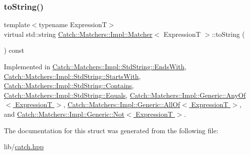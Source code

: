 \subsubsection{\texorpdfstring{to\+String()}{toString()}}
{\footnotesize\ttfamily template$<$typename ExpressionT$>$ \\
virtual std\+::string \hyperlink{struct_catch_1_1_matchers_1_1_impl_1_1_matcher}{Catch\+::\+Matchers\+::\+Impl\+::\+Matcher}$<$ ExpressionT $>$\+::to\+String (\begin{DoxyParamCaption}{ }\end{DoxyParamCaption}) const\hspace{0.3cm}{\ttfamily [pure virtual]}}



Implemented in \hyperlink{struct_catch_1_1_matchers_1_1_impl_1_1_std_string_1_1_ends_with_a2a4675e3d2369d587af36f051fb7964f}{Catch\+::\+Matchers\+::\+Impl\+::\+Std\+String\+::\+Ends\+With}, \hyperlink{struct_catch_1_1_matchers_1_1_impl_1_1_std_string_1_1_starts_with_a85a24e2ac23025edbe31cbf5bb755fb3}{Catch\+::\+Matchers\+::\+Impl\+::\+Std\+String\+::\+Starts\+With}, \hyperlink{struct_catch_1_1_matchers_1_1_impl_1_1_std_string_1_1_contains_aed168ddff5bce9295aec5c7daca89849}{Catch\+::\+Matchers\+::\+Impl\+::\+Std\+String\+::\+Contains}, \hyperlink{struct_catch_1_1_matchers_1_1_impl_1_1_std_string_1_1_equals_ab0d73961b95d9836d77b9e2e94c3790b}{Catch\+::\+Matchers\+::\+Impl\+::\+Std\+String\+::\+Equals}, \hyperlink{class_catch_1_1_matchers_1_1_impl_1_1_generic_1_1_any_of_a331aaf012b133682eadc9ed5342f848a}{Catch\+::\+Matchers\+::\+Impl\+::\+Generic\+::\+Any\+Of$<$ Expression\+T $>$}, \hyperlink{class_catch_1_1_matchers_1_1_impl_1_1_generic_1_1_all_of_a8c8e7742501dc81e51a3c745d6f74119}{Catch\+::\+Matchers\+::\+Impl\+::\+Generic\+::\+All\+Of$<$ Expression\+T $>$}, and \hyperlink{class_catch_1_1_matchers_1_1_impl_1_1_generic_1_1_not_ab970a4a6e58a987451e0b0e0e60a0bff}{Catch\+::\+Matchers\+::\+Impl\+::\+Generic\+::\+Not$<$ Expression\+T $>$}.



The documentation for this struct was generated from the following file\+:\begin{DoxyCompactItemize}
\item 
lib/\hyperlink{catch_8hpp}{catch.\+hpp}\end{DoxyCompactItemize}
